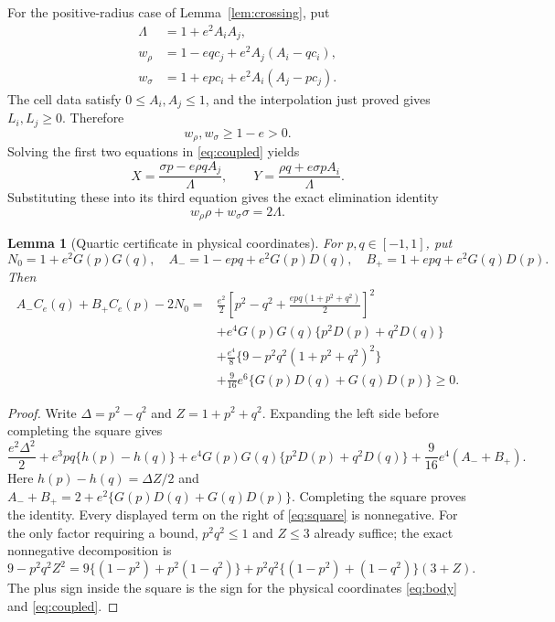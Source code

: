\documentclass[11pt]{amsart}
\newtheorem{lemma}[theorem]{Lemma}
\theoremstyle{definition}
\theoremstyle{remark}
\begin{document}
For the positive-radius case of Lemma~\ref{lem:crossing}, put
\begin{equation}\label{eq:weights}
\begin{split}
 \Lambda&=1+e^2A_iA_j,\\
 w_\rho&=1-eqc_j+e^2A_j(A_i-qc_i),\\
 w_\sigma&=1+epc_i+e^2A_i(A_j-pc_j).
\end{split}
\end{equation}
The cell data satisfy $0\le A_i,A_j\le1$, and the interpolation just
proved gives $L_i,L_j\ge0$. Therefore
\begin{equation}\label{eq:weight-positivity}
 w_\rho,w_\sigma\ge1-e>0.
\end{equation}
Solving the first two equations in \eqref{eq:coupled} yields
\[
 X=\frac{\sigma p-e\rho qA_j}{\Lambda},\qquad
 Y=\frac{\rho q+e\sigma pA_i}{\Lambda}.
\]
Substituting these into its third equation gives the exact elimination
identity
\begin{equation}\label{eq:weighted-radii}
 w_\rho\rho+w_\sigma\sigma=2\Lambda.
\end{equation}

\begin{lemma}[Quartic certificate in physical coordinates]\label{lem:square}
For $p,q\in[-1,1]$, put
\[
 N_0=1+e^2G(p)G(q),\quad
 A_-=1-epq+e^2G(p)D(q),\quad
 B_+=1+epq+e^2G(q)D(p).
\]
Then
\begin{equation}\label{eq:square}
\begin{split}
 A_-C_e(q)+B_+C_e(p)-2N_0
 ={}&\frac{e^2}{2}
 \left[p^2-q^2+\frac{epq(1+p^2+q^2)}2\right]^2\\
 &+e^4G(p)G(q)\{p^2D(p)+q^2D(q)\}\\
 &+\frac{e^4}{8}\{9-p^2q^2(1+p^2+q^2)^2\}\\
 &+\frac9{16}e^6\{G(p)D(q)+G(q)D(p)\}\ge0.
\end{split}
\end{equation}
\end{lemma}
\begin{proof}
Write $\Delta=p^2-q^2$ and $Z=1+p^2+q^2$. Expanding the left
side before completing the square gives
\[
 \frac{e^2\Delta^2}{2}
 +e^3pq\{h(p)-h(q)\}
 +e^4G(p)G(q)\{p^2D(p)+q^2D(q)\}
 +\frac9{16}e^4(A_-+B_+).
\]
Here $h(p)-h(q)=\Delta Z/2$ and
$A_-+B_+=2+e^2\{G(p)D(q)+G(q)D(p)\}$. Completing the square
proves the identity. Every displayed term on the right of
\eqref{eq:square} is nonnegative. For the only factor requiring a
bound, $p^2q^2\le1$ and $Z\le3$ already suffice; the exact
nonnegative decomposition is
\[
 9-p^2q^2Z^2
 =9\{(1-p^2)+p^2(1-q^2)\}
  +p^2q^2\{(1-p^2)+(1-q^2)\}(3+Z).
\]
The plus sign inside the square is the sign for the physical coordinates
\eqref{eq:body} and \eqref{eq:coupled}.
\end{proof}
\end{document}
